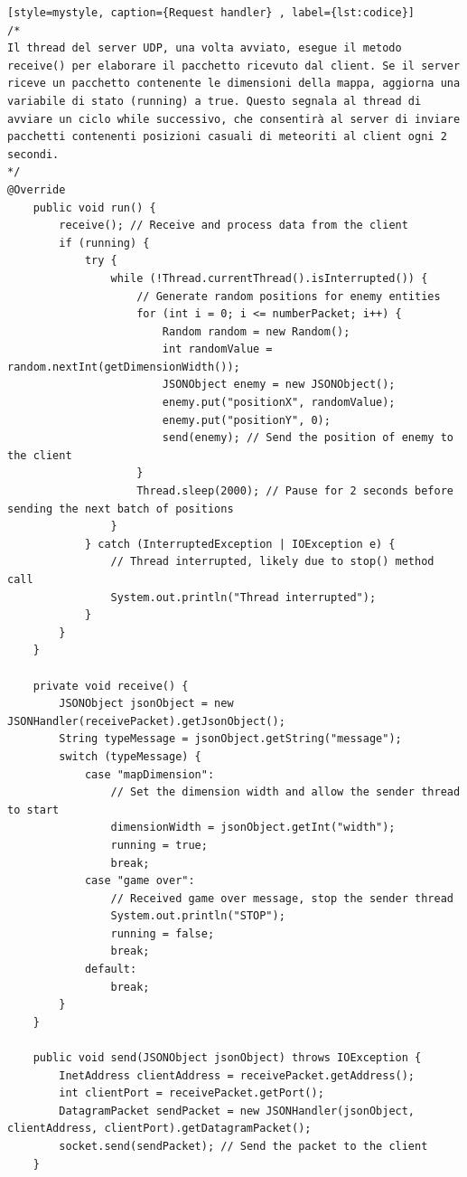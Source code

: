 \documentclass{article}
\begin{document}
\begin{lstlisting}[style=mystyle, caption={Request handler} , label={lst:codice}]
/*
Il thread del server UDP, una volta avviato, esegue il metodo receive() per elaborare il pacchetto ricevuto dal client. Se il server riceve un pacchetto contenente le dimensioni della mappa, aggiorna una variabile di stato (running) a true. Questo segnala al thread di avviare un ciclo while successivo, che consentirà al server di inviare pacchetti contenenti posizioni casuali di meteoriti al client ogni 2 secondi.
*/
@Override
    public void run() {
        receive(); // Receive and process data from the client
        if (running) {
            try {
                while (!Thread.currentThread().isInterrupted()) {
                    // Generate random positions for enemy entities
                    for (int i = 0; i <= numberPacket; i++) {
                        Random random = new Random();
                        int randomValue = random.nextInt(getDimensionWidth());
                        JSONObject enemy = new JSONObject();
                        enemy.put("positionX", randomValue);
                        enemy.put("positionY", 0);
                        send(enemy); // Send the position of enemy to the client
                    }
                    Thread.sleep(2000); // Pause for 2 seconds before sending the next batch of positions
                }
            } catch (InterruptedException | IOException e) {
                // Thread interrupted, likely due to stop() method call
                System.out.println("Thread interrupted");
            }
        }
    }

    private void receive() {
        JSONObject jsonObject = new JSONHandler(receivePacket).getJsonObject();
        String typeMessage = jsonObject.getString("message");
        switch (typeMessage) {
            case "mapDimension":
                // Set the dimension width and allow the sender thread to start
                dimensionWidth = jsonObject.getInt("width");
                running = true;
                break;
            case "game over":
                // Received game over message, stop the sender thread
                System.out.println("STOP");
                running = false;
                break;
            default:
                break;
        }
    }

    public void send(JSONObject jsonObject) throws IOException {
        InetAddress clientAddress = receivePacket.getAddress();
        int clientPort = receivePacket.getPort();
        DatagramPacket sendPacket = new JSONHandler(jsonObject, clientAddress, clientPort).getDatagramPacket();
        socket.send(sendPacket); // Send the packet to the client
    }

\end{lstlisting}
\end{document}
